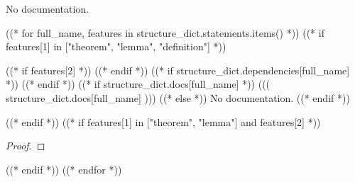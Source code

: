 \begin{definition}\label{ConvergesTo}
        \leanok
                No documentation.
    \end{definition}




((* for full_name, features in structure_dict.statements.items() *))
((* if features[1] in ["theorem", "lemma", "definition"] *))
\begin{((( features[1] )))}\label{((( full_name )))}
    ((* if features[2] *))
    \leanok
    ((* endif *))
    ((* if structure_dict.dependencies[full_name] *))
    ((* endif *))
    ((* if structure_dict.docs[full_name] *))
        ((( structure_dict.docs[full_name] )))
    ((* else *))
        No documentation.
    ((* endif *))
\end{((( features[1] )))}

((* endif *))
((* if features[1] in ["theorem", "lemma"] and features[2] *))
\begin{proof}
    \leanok
\end{proof}

((* endif *))
((* endfor *))
